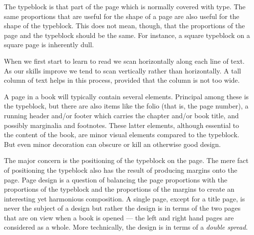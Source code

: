 \documentclass[10pt,a4paper,extrafontsizes]{memoir}
\begin{document}
\begin{paracol}{2}
\switchEng
    The typeblock is that part of the page which is normally 
covered with type. The same proportions that are useful for the shape of a 
page are also useful for the shape of the typeblock. This does not mean, 
though, that the proportions of the page and the typeblock should be the same. 
For instance, a square typeblock on a square page is inherently dull.

    When we first start to learn to read we scan horizontally along each line
of text. As our skills improve we tend to scan vertically rather than
horizontally. A tall column of text helps in this process, 
provided that the column is not too wide.

    A page in a book will typically contain several elements. Principal
among these is the typeblock, but there are also items like 
the folio (that is, the page number), 
a running header and/or footer 
which carries the chapter 
and/or book title, and possibly marginalia and 
footnotes. These latter
elements, although essential to the content of the book, are minor visual
elements compared to the typeblock. 
But even minor decoration can obscure
or kill an otherwise good design.

  The major concern is the positioning of the typeblock on the page. 
The mere fact of positioning the typeblock also has 
the result of producing margins onto the page. 
Page design is a question of balancing the page proportions
with the proportions of the typeblock and the proportions 
of the margins to 
create an interesting yet harmonious composition. A single page, except
for a title page, is never the subject of a design but rather the design
is in terms of the two pages that are on view when a book is opened --- the
left and right hand pages are considered as a whole. More technically, the
design is in terms of a \emph{double spread}.
\end{paracol}
\end{document}
